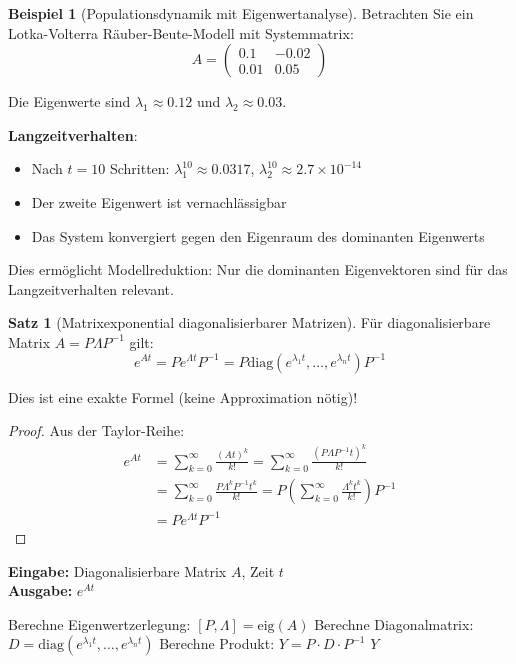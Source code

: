﻿\documentclass[a4paper,12pt]{report}
\theoremstyle{definition}
\newtheorem{beispiel}{Beispiel}
\newtheorem{satz}{Satz}
\begin{document}
	\begin{beispiel}[Populationsdynamik mit Eigenwertanalyse]
		Betrachten Sie ein Lotka-Volterra Räuber-Beute-Modell mit Systemmatrix:
		\[
		A = \begin{pmatrix}
			0.1 & -0.02 \\
			0.01 & 0.05
		\end{pmatrix}
		\]
		
		Die Eigenwerte sind $\lambda_1 \approx 0.12$ und $\lambda_2 \approx 0.03$.
		
		\textbf{Langzeitverhalten}:
		\begin{itemize}
			\item Nach $t = 10$ Schritten: $\lambda_1^{10} \approx 0.0317$, $\lambda_2^{10} \approx 2.7 \times 10^{-14}$
			\item Der zweite Eigenwert ist vernachlässigbar
			\item Das System konvergiert gegen den Eigenraum des dominanten Eigenwerts
		\end{itemize}
		
		Dies ermöglicht Modellreduktion: Nur die dominanten Eigenvektoren sind für das Langzeitverhalten relevant.
	\end{beispiel}
	
	\begin{satz}[Matrixexponential diagonalisierbarer Matrizen]
		Für diagonalisierbare Matrix $A = P \Lambda P^{-1}$ gilt:
		\[
		e^{At} = P e^{\Lambda t} P^{-1} = P \text{diag}(e^{\lambda_1 t}, \ldots, e^{\lambda_n t}) P^{-1}
		\]
		
		Dies ist eine exakte Formel (keine Approximation nötig)!
	\end{satz}
	
	\begin{proof}
		Aus der Taylor-Reihe:
		\begin{align}
			e^{At} &= \sum_{k=0}^{\infty} \frac{(At)^k}{k!} = \sum_{k=0}^{\infty} \frac{(P \Lambda P^{-1} t)^k}{k!} \\
			&= \sum_{k=0}^{\infty} \frac{P \Lambda^k P^{-1} t^k}{k!} = P \left(\sum_{k=0}^{\infty} \frac{\Lambda^k t^k}{k!}\right) P^{-1} \\
			&= P e^{\Lambda t} P^{-1}
		\end{align}
	\end{proof}
	
	\begin{algorithm}[H]
		\caption{Matrixexponential via Eigenwertzerlegung}
		\label{alg:matrix-exp-eigenvalue}
		\textbf{Eingabe:} Diagonalisierbare Matrix $A$, Zeit $t$ \\
		\textbf{Ausgabe:} $e^{At}$
		\begin{algorithmic}[1]
			\State Berechne Eigenwertzerlegung: $[P, \Lambda] = \text{eig}(A)$
			\State Berechne Diagonalmatrix: $D = \text{diag}(e^{\lambda_1 t}, \ldots, e^{\lambda_n t})$
			\State Berechne Produkt: $Y = P \cdot D \cdot P^{-1}$
			\State \Return $Y$
		\end{algorithmic}
	\end{algorithm}
	
\end{document}
